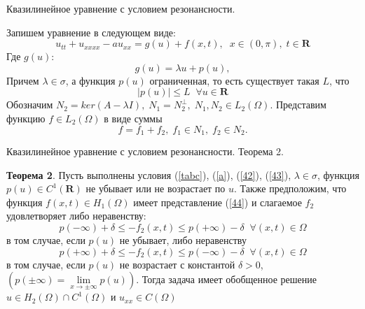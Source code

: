 \documentclass[ignorenonframetext,unicode,handout, 9pt]{beamer}
\numberwithin{equation}{section}
\begin{document}
\begin{frame}{Квазилинейное уравнение с условием  резонансности.}

Запишем уравнение в следующем виде:
\begin{equation}\label{54}
u_{tt} + u_{xxxx} - a u_{xx} = g(u) + f(x,t), \;\; x \in (0,\pi),\; t \in \textbf{R}
\end{equation}
Где $g(u):$
\begin{equation}\label{42}
g(u) = \lambda u  + p(u),
\end{equation}
Причем $\lambda \in \sigma$, а функция $p(u)$ ограниченная, то есть существует такая $L$, что
\begin{equation}\label{43}
  |p(u)| \leqslant L \;\; \forall u \in \textbf{R}
\end{equation}
Обозначим $ N_2 = ker (A - \lambda I), \; N_1 = N_2^{\bot}, \; N_1, N_2 \in L_2(\Omega)$. Представим функцию $f \in L_2(\Omega)$ в виде суммы
\begin{equation}\label{44}
  f = f_1 + f_2, \; f_1 \in N_1, \; f_2 \in N_2.
\end{equation}

\end{frame}


\begin{frame}{Квазилинейное уравнение с условием  резонансности. Теорема 2.}

\textbf{Теорема 2}. Пусть выполнены условия (\ref{tabc}), (\ref{a}), (\ref{42}), (\ref{43}), $\lambda \in \sigma$, функция $p(u) \in C^{1}(\textbf{R})$ не убывает или не возрастает по $u$. Также предположим, что функция $f(x,t) \in H_1(\Omega)$ имеет представление (\ref{44}) и слагаемое $f_2$ удовлетворяет либо неравенству:
\begin{equation}\label{461}
  p(-\infty) + \delta \leqslant -f_2(x,t) \leqslant p(+\infty) - \delta \;\; \forall (x,t) \in \Omega
\end{equation}
в том случае, если $p(u)$ не убывает,  либо неравенству
\begin{equation}\label{462}
  p(+\infty) + \delta \leqslant -f_2(x,t) \leqslant p(-\infty) - \delta \;\; \forall (x,t) \in \Omega
\end{equation}
в том случае, если $p(u)$ не возрастает с константой $ \delta > 0$, $(p(\pm\infty) = \lim\limits_{x \rightarrow \pm \infty}p(u))$.  Тогда задача  имеет обобщенное решение  $u \in H_2(\Omega) \cap C^{1}(\Omega)$ и $u_{xx} \in C(\Omega)$

\end{frame}
\end{document}
